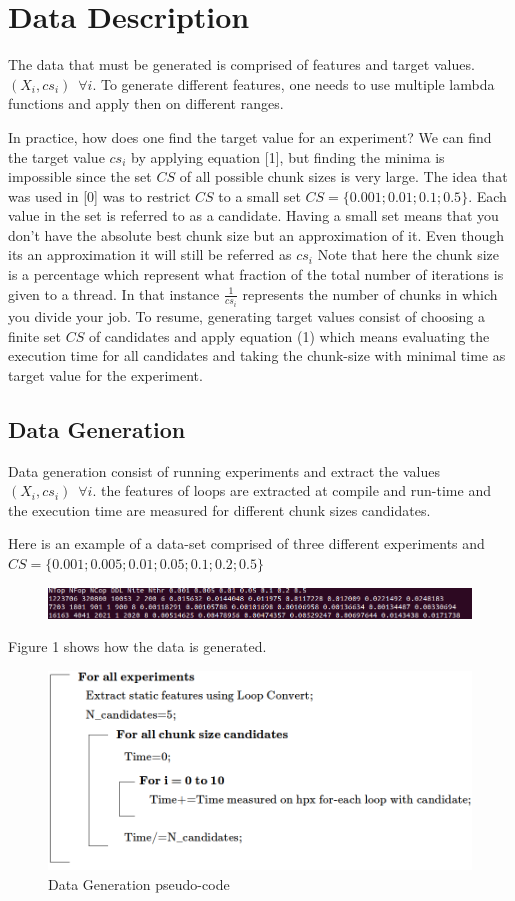 \section{Data Description}
The data that must be generated is comprised of features and target values. $(X_i,cs_i) \, \, \, \forall i$. To generate different features, one needs to use multiple lambda functions and apply then on different ranges.

In practice, how does one find the target value for an experiment? We can find the target value $cs_i$ by applying equation [1], but finding the minima is impossible since the set $CS$ of all possible chunk sizes is very large. The idea that was used in [0] was to restrict $CS$ to a small set
$CS=\{0.001;0.01;0.1;0.5\}$. Each value in the set is referred to as a candidate. Having a small set means that you don't have the absolute best chunk size but an approximation of it. Even though its an approximation it will still be referred as $cs_i$
Note that here the chunk size is a percentage which represent what fraction of the total number of iterations is given to a thread. In that instance $\frac{1}{cs_i}$ represents the number of chunks in which you divide your job. To resume, generating target values consist of choosing a finite set $CS$ of candidates and apply equation (1) which means evaluating the execution time for all candidates and taking the chunk-size with minimal time as target value for the experiment.


\subsection{Data Generation}
Data generation consist of running experiments and extract the values $(X_i,cs_i) \, \, \, \forall i$. the features of loops are extracted at compile and run-time and the execution time are measured for different chunk sizes candidates. 

Here is an example of a data-set comprised of three different experiments and $CS=\{0.001;0.005;0.01;0.05;0.1;0.2;0.5\}$

\begin{figure}[h]
	\centering
	\includegraphics[scale=0.45]{images/screenshot_data.png}
\end{figure}

Figure 1 shows how the data is generated.

\begin{figure}[h]
	\centering
	\caption{Data Generation pseudo-code}
	\includegraphics[scale=0.49]{images/pseudo-code.png}
\end{figure}
